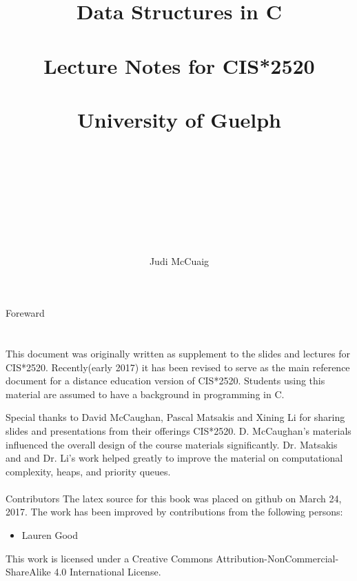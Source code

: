 \documentclass{book}
\begin{document}
\title{{ ~\\~\\~\\~\\~\\ Data Structures in C \\\Large ~\\Lecture Notes for  CIS*2520 \\~\\University of Guelph\\~\\~\\~\\~\\}}
\author{Judi McCuaig }
\maketitle

\Huge 
Foreward
\\ \\ \\
\normalsize
This document was originally written as supplement to the slides and lectures for CIS*2520.  Recently(early 2017) it has been revised to serve as the main reference document for a distance education version of CIS*2520.   Students using this material are assumed to have  a background in programming in C.   

Special thanks to David McCaughan, Pascal Matsakis and Xining Li for sharing  slides and presentations from their offerings CIS*2520.  D. McCaughan's materials influenced the overall design of the course materials significantly.   Dr. Matsakis and and Dr. Li's work helped greatly to  improve the material on computational complexity,  heaps, and priority queues.
\\ \\
\large
Contributors
\normalsize
The latex source for this book was placed on github on March 24, 2017.  The work has been improved by contributions from the following persons:
\begin{itemize}
\item Lauren Good
\end{itemize}

This work is licensed under a Creative Commons Attribution-NonCommercial-ShareAlike 4.0 International License.




\tableofcontents


\mainmatter




%













%
\end{document}
